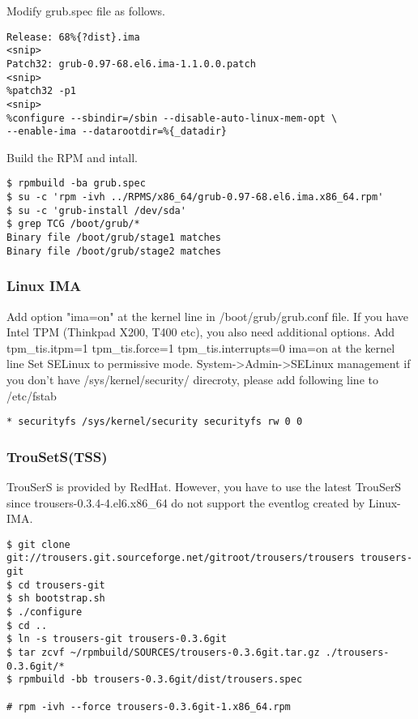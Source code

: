 Modify grub.spec file as follows.

\begin{lstlisting}[style=source_code]
Release: 68%{?dist}.ima
<snip>
Patch32: grub-0.97-68.el6.ima-1.1.0.0.patch
<snip>
%patch32 -p1
<snip>
%configure --sbindir=/sbin --disable-auto-linux-mem-opt \
--enable-ima --datarootdir=%{_datadir}
\end{lstlisting}

Build the RPM and intall.

\begin{lstlisting}[style=console, linewidth = 170mm]
$ rpmbuild -ba grub.spec
$ su -c 'rpm -ivh ../RPMS/x86_64/grub-0.97-68.el6.ima.x86_64.rpm'
$ su -c 'grub-install /dev/sda'
$ grep TCG /boot/grub/*
Binary file /boot/grub/stage1 matches
Binary file /boot/grub/stage2 matches
\end{lstlisting}

\subsubsection{Linux IMA} 

Add option "ima=on" at the kernel line in /boot/grub/grub.conf file.
If you have Intel TPM (Thinkpad X200, T400 etc), you also need additional options.
Add tpm\_tis.itpm=1 tpm\_tis.force=1 tpm\_tis.interrupts=0 ima=on at the kernel line
Set SELinux to permissive mode. System->Admin->SELinux management
if you don't have /sys/kernel/security/ direcroty, please add following line to /etc/fstab

\begin{lstlisting}[style=source_code]
    * securityfs /sys/kernel/security securityfs rw 0 0 
\end{lstlisting}

\subsubsection{TrouSetS(TSS)}

TrouSerS is provided by RedHat.
However, you have to use the latest TrouSerS
since trousers-0.3.4-4.el6.x86\_64 do not support the eventlog created by Linux-IMA.

\begin{lstlisting}[style=source_code]
$ git clone git://trousers.git.sourceforge.net/gitroot/trousers/trousers trousers-git
$ cd trousers-git
$ sh bootstrap.sh
$ ./configure
$ cd ..
$ ln -s trousers-git trousers-0.3.6git
$ tar zcvf ~/rpmbuild/SOURCES/trousers-0.3.6git.tar.gz ./trousers-0.3.6git/*
$ rpmbuild -bb trousers-0.3.6git/dist/trousers.spec

# rpm -ivh --force trousers-0.3.6git-1.x86_64.rpm
\end{lstlisting}


